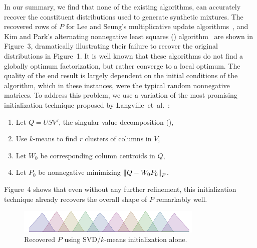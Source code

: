 \documentclass[conference]{IEEEtran}
\begin{document}
In our summary, we find that none of the existing  algorithms, can accurately recover the constituent distributions used to generate synthetic mixtures.
The recovered rows of $P$ for Lee and Seung's multiplicative update algorithms~\cite{Lee01}, and Kim and Park's alternating nonnegative least squares () algorithm~\cite{Kim08} are shown in Figure~3, dramatically illustrating their failure to recover the original distributions in Figure~1.
It is well known that these algorithms do not find a globally optimum factorization, but rather converge to a local optimum.
The quality of the end result is largely dependent on the initial conditions of the algorithm, which in these instances, were the typical random nonnegative matrices.
To address this problem, we use a variation of the most promising initialization technique proposed by Langville~et~al.~\cite{Langville07}:
\begin{enumerate}
  \item Let $Q=USV'$, the singular value decomposition (),
  \item Use $k$-means to find $r$ clusters of columns in $V$,
  \item Let $W_0$ be corresponding column centroids in $Q$,
  \item Let $P_0$ be nonnegative minimizing ${\lVert Q - W_0 P_0\rVert}_F$.
\end{enumerate}
Figure~4 shows that even without any further refinement, this initialization technique already recovers the overall shape of $P$ remarkably well.

\begin{figure}[t]
\begin{center}
\includegraphics[width=3.5in]{synth/Q_ki}
\end{center}
\vspace{-0.7em}
\caption{Recovered $P$ using SVD/$k$-means initialization alone.}
\vspace{-0.5em}
\end{figure}



\end{document}
